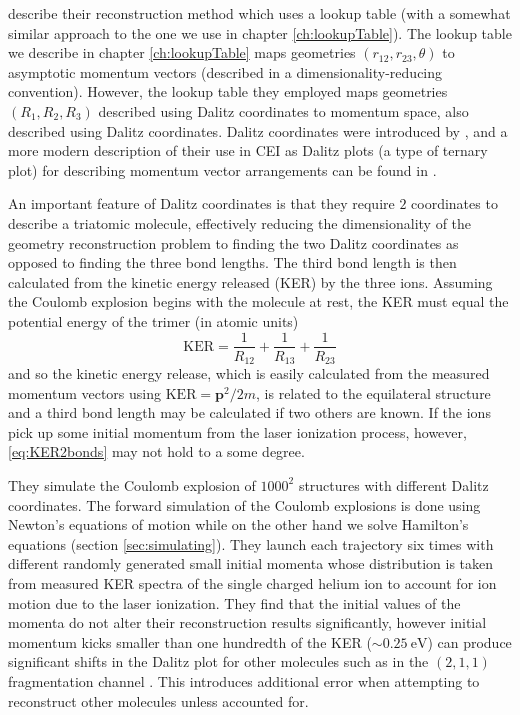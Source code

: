 \citet[supplementary material]{Kunitski15} describe their reconstruction method which uses a lookup table (with a somewhat similar approach to the one we use in chapter \ref{ch:lookupTable}). The lookup table we describe in chapter \ref{ch:lookupTable} maps geometries $(r_{12}, r_{23}, \theta)$ to asymptotic momentum vectors (described in a dimensionality-reducing convention). However, the lookup table they employed maps geometries $(R_1, R_2, R_3)$ described using Dalitz coordinates to momentum space, also described using Dalitz coordinates. Dalitz coordinates were introduced by \citet{Dalitz53}, and a more modern description of their use in CEI as Dalitz plots (a type of ternary plot) for describing momentum vector arrangements can be found in \citet{Ramadhan16}.

An important feature of Dalitz coordinates is that they require $2$ coordinates to describe a triatomic molecule, effectively reducing the dimensionality of the geometry reconstruction problem to finding the two Dalitz coordinates as opposed to finding the three bond lengths. The third bond length is then calculated from the kinetic energy released (KER) by the three ions. Assuming the Coulomb explosion begins with the molecule at rest, the KER must equal the potential energy of the trimer (in atomic units)
\begin{equation} \label{eq:KER2bonds}
\mathrm{KER} = \frac{1}{R_{12}} + \frac{1}{R_{13}} + \frac{1}{R_{23}}
\end{equation}
and so the kinetic energy release, which is easily calculated from the measured momentum vectors using $\mathrm{KER} = \mathbf{p}^2/2m$, is related to the equilateral structure and a third bond length may be calculated if two others are known. If the ions pick up some initial momentum from the laser ionization process, however, \eqref{eq:KER2bonds} may not hold to a some degree.

They simulate the Coulomb explosion of $1000^2$ structures with different Dalitz coordinates. The forward simulation of the Coulomb explosions is done using Newton's equations of motion while on the other hand we solve Hamilton's equations (section \ref{sec:simulating}). They launch each trajectory six times with different randomly generated small initial momenta whose distribution is taken from measured KER spectra of the single charged helium ion to account for ion motion due to the laser ionization. They find that the initial values of the momenta do not alter their reconstruction results significantly, however initial momentum kicks smaller than one hundredth of the KER ($\sim\SI{0.25}{\eV}$) can produce significant shifts in the Dalitz plot for other molecules such as  in the $(2,1,1)$ fragmentation channel \citep{Ramadhan16}. This introduces additional error when attempting to reconstruct other molecules unless accounted for.


